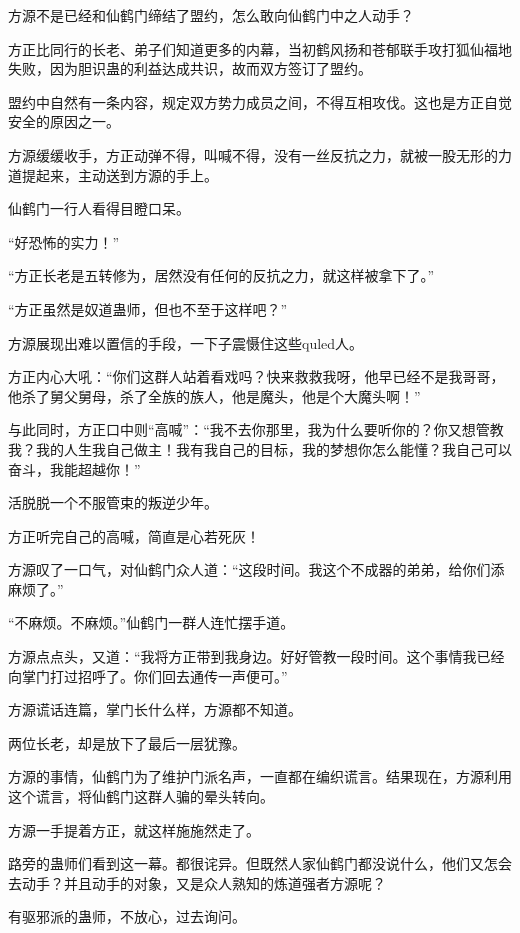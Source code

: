 
\begin{this_body}

方源不是已经和仙鹤门缔结了盟约，怎么敢向仙鹤门中之人动手？

方正比同行的长老、弟子们知道更多的内幕，当初鹤风扬和苍郁联手攻打狐仙福地失败，因为胆识蛊的利益达成共识，故而双方签订了盟约。

盟约中自然有一条内容，规定双方势力成员之间，不得互相攻伐。这也是方正自觉安全的原因之一。

方源缓缓收手，方正动弹不得，叫喊不得，没有一丝反抗之力，就被一股无形的力道提起来，主动送到方源的手上。

仙鹤门一行人看得目瞪口呆。

“好恐怖的实力！”

“方正长老是五转修为，居然没有任何的反抗之力，就这样被拿下了。”

“方正虽然是奴道蛊师，但也不至于这样吧？”

方源展现出难以置信的手段，一下子震慑住这些quled人。

方正内心大吼：“你们这群人站着看戏吗？快来救救我呀，他早已经不是我哥哥，他杀了舅父舅母，杀了全族的族人，他是魔头，他是个大魔头啊！”

与此同时，方正口中则“高喊”：“我不去你那里，我为什么要听你的？你又想管教我？我的人生我自己做主！我有我自己的目标，我的梦想你怎么能懂？我自己可以奋斗，我能超越你！”

活脱脱一个不服管束的叛逆少年。

方正听完自己的高喊，简直是心若死灰！

方源叹了一口气，对仙鹤门众人道：“这段时间。我这个不成器的弟弟，给你们添麻烦了。”

“不麻烦。不麻烦。”仙鹤门一群人连忙摆手道。

方源点点头，又道：“我将方正带到我身边。好好管教一段时间。这个事情我已经向掌门打过招呼了。你们回去通传一声便可。”

方源谎话连篇，掌门长什么样，方源都不知道。

两位长老，却是放下了最后一层犹豫。

方源的事情，仙鹤门为了维护门派名声，一直都在编织谎言。结果现在，方源利用这个谎言，将仙鹤门这群人骗的晕头转向。

方源一手提着方正，就这样施施然走了。

路旁的蛊师们看到这一幕。都很诧异。但既然人家仙鹤门都没说什么，他们又怎会去动手？并且动手的对象，又是众人熟知的炼道强者方源呢？

有驱邪派的蛊师，不放心，过去询问。


\end{this_body}

